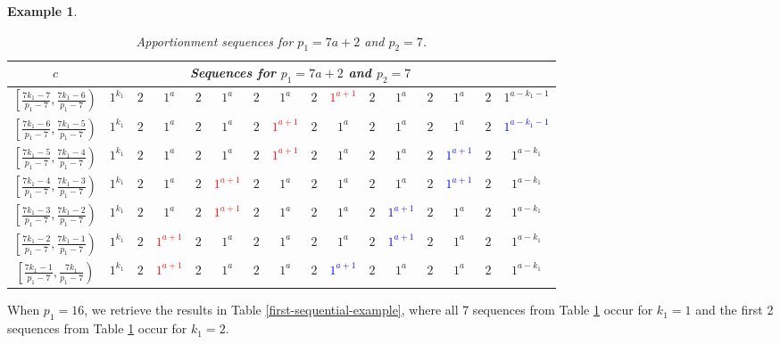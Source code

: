 \documentclass[pdflatex,sn-mathphys-num]{sn-jnl}
\theoremstyle{thmstyleone}%
\theoremstyle{thmstyletwo}%
\newtheorem{example}{Example}%
\theoremstyle{thmstylethree}%
\begin{document}
\begin{example}
\begin{table}[tbh]
 \caption{Apportionment sequences for $p_1=7a+2$ and $p_2 = 7$.}
 \label{tab:m7}
\renewcommand{\arraystretch}{1.65}
\setlength{\tabcolsep}{2pt}
\begin{tabular}{c|*{15}c}
$c$ & \multicolumn{14}{c}{Sequences for $p_1=7a+2$ and $p_2 = 7$}  \\
\hline 
             $\left[ \frac{7k_1-7}{p_1-7}, \frac{7k_1-6}{p_1-7} \right)$ & $1^{k_1}$ & $2$ & $1^a$ & $2$ & $1^a$ & $2$ & $1^a$ & $2$ & \textcolor{red}{$1^{a+1}$} & $2$ & $1^a$ & $2$ & $1^a$ & $2$ & $1^{a-k_1-1}$ \\
$\left[ \frac{7k_1-6}{p_1-7}, \frac{7k_1-5}{p_1-7} \right)$ & $1^{k_1}$ & $2$ & $1^a$ & $2$ & $1^a$ & $2$ & \textcolor{red}{$1^{a+1}$} & $2$ & $1^a$ & $2$ & $1^a$ & $2$ & $1^a$ & $2$ & \textcolor{blue}{$1^{a-k_1-1}$} \\
$\left[ \frac{7k_1-5}{p_1-7}, \frac{7k_1-4}{p_1-7} \right)$ & $1^{k_1}$ & $2$ & $1^a$ & $2$ & $1^a$ & $2$ & \textcolor{red}{$1^{a+1}$} & $2$ & $1^a$ & $2$ & $1^a$ & $2$ & \textcolor{blue}{$1^{a+1}$} & $2$ & $1^{a-k_1}$ \\
$\left[ \frac{7k_1-4}{p_1-7}, \frac{7k_1-3}{p_1-7} \right)$ & $1^{k_1}$ & $2$ & $1^a$ & $2$ & \textcolor{red}{$1^{a+1}$} & $2$ & $1^a$ & $2$ & $1^a$ & $2$ & $1^a$ & $2$ & \textcolor{blue}{$1^{a+1}$} & $2$ & $1^{a-k_1}$ \\ 
$\left[ \frac{7k_1-3}{p_1-7}, \frac{7k_1-2}{p_1-7} \right)$ & $1^{k_1}$ & $2$ & $1^a$ & $2$ & \textcolor{red}{$1^{a+1}$} & $2$ & $1^a$ & $2$ & $1^a$ & $2$ & \textcolor{blue}{$1^{a+1}$} & $2$ & $1^a$ & $2$ & $1^{a-k_1}$ \\ 
$\left[ \frac{7k_1-2}{p_1-7}, \frac{7k_1-1}{p_1-7} \right)$ & $1^{k_1}$ & $2$ & \textcolor{red}{$1^{a+1}$} & $2$ & $1^a$ & $2$ & $1^a$ & $2$ & $1^a$ & $2$ & \textcolor{blue}{$1^{a+1}$} & $2$ & $1^a$ & $2$ & $1^{a-k_1}$ \\
$\left[ \frac{7k_1-1}{p_1-7}, \frac{7k_1}{p_1-7} \right)$ & $1^{k_1}$ & $2$ & \textcolor{red}{$1^{a+1}$} & $2$ & $1^a$ & $2$ & $1^a$ & $2$ & \textcolor{blue}{$1^{a+1}$} & $2$ & $1^a$ & $2$ & $1^a$ & $2$ & $1^{a-k_1}$ \\
 \end{tabular} 
\end{table}
\end{example}


When $p_1=16$, we retrieve the results in Table \ref{first-sequential-example},  where all 7 sequences from Table \ref{tab:m7} occur for $k_1=1$ and the first 2 sequences from Table \ref{tab:m7}  occur for $k_1=2$.  
\end{document}
